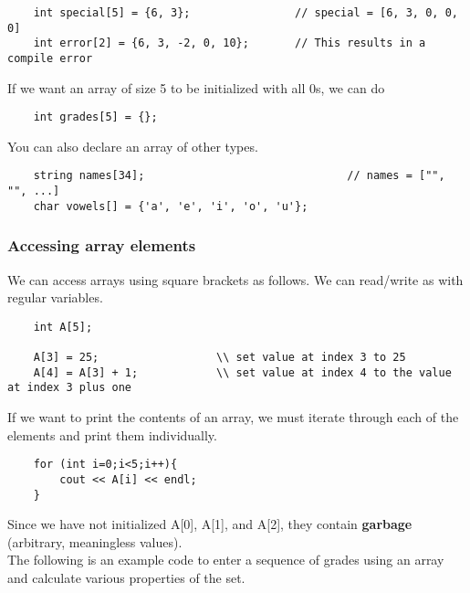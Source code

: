 \documentclass[]{article}
\begin{document}
\begin{lstlisting}
	int special[5] = {6, 3};  				// special = [6, 3, 0, 0, 0]
	int error[2] = {6, 3, -2, 0, 10};		// This results in a compile error
\end{lstlisting}\bigbreak

If we want an array of size 5 to be initialized with all 0s, we can do

\begin{lstlisting}
	int grades[5] = {};
\end{lstlisting}\bigbreak

You can also declare an array of other types.

\begin{lstlisting}
	string names[34]; 								// names = ["", "", ...]
	char vowels[] = {'a', 'e', 'i', 'o', 'u'};
\end{lstlisting}\bigbreak


\subsubsection{Accessing array elements}
\bigbreak

We can access arrays using square brackets as follows. We can read/write as with regular variables.

\begin{lstlisting}
	int A[5];
	
	A[3] = 25;					\\ set value at index 3 to 25
	A[4] = A[3] + 1;			\\ set value at index 4 to the value at index 3 plus one
\end{lstlisting}\bigbreak

If we want to print the contents of an array, we must iterate through each of the elements and print them individually.

\begin{lstlisting}
	for (int i=0;i<5;i++){
		cout << A[i] << endl;
	}
\end{lstlisting}\bigbreak

Since we have not initialized A[0], A[1], and A[2], they contain \textbf{garbage} (arbitrary, meaningless values).\\


The following is an example code to enter a sequence of grades using an array and calculate various properties of the set.\\
\end{document}
